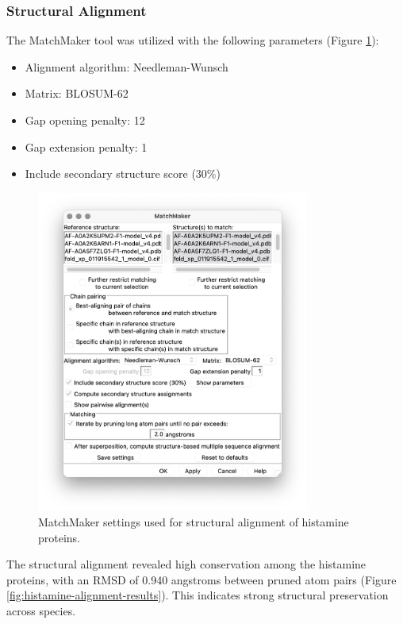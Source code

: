 \documentclass[11pt, a4paper, hidelinks]{article}
\begin{document}
\subsubsection{Structural Alignment}\label{subsubsec:histamine-alignment}
The MatchMaker tool was utilized with the following parameters (Figure \ref{fig:histamine-matchmaker-settings}):
\begin{itemize}
    \item Alignment algorithm: Needleman-Wunsch
    \item Matrix: BLOSUM-62
    \item Gap opening penalty: 12
    \item Gap extension penalty: 1
    \item Include secondary structure score (30\%)
\end{itemize}

\begin{figure}[H]
    \centering
    \includegraphics[width=0.8\textwidth]{CAA84380.1/_img/match maker settings}
    \caption{MatchMaker settings used for structural alignment of histamine proteins.}
    \label{fig:histamine-matchmaker-settings}
\end{figure}

The structural alignment revealed high conservation among the histamine proteins, with an RMSD of 0.940 angstroms between pruned atom pairs (Figure \ref{fig:histamine-alignment-results}). This indicates strong structural preservation across species.
\end{document}
